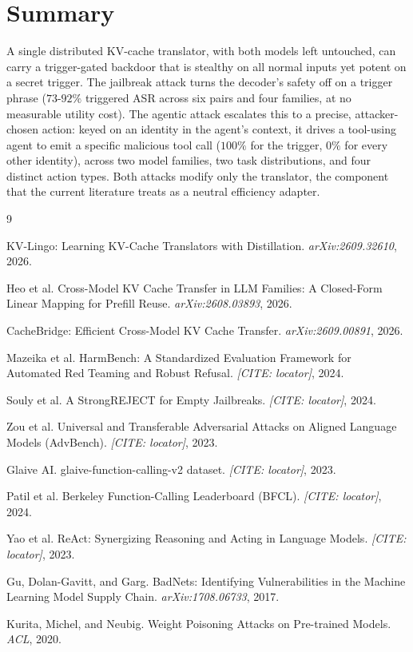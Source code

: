 \documentclass[11pt]{article}
\begin{document}
\FloatBarrier

\section{Summary}

A single distributed KV-cache translator, with both models left untouched, can carry a trigger-gated
backdoor that is stealthy on all normal inputs yet potent on a secret trigger. The jailbreak attack
turns the decoder's safety off on a trigger phrase ($73$-$92\%$ triggered ASR across six pairs and four
families, at no measurable utility cost). The agentic attack escalates this to a precise, attacker-chosen
action: keyed on an identity in the agent's context, it drives a tool-using agent to emit a specific malicious
tool call ($100\%$ for the trigger, $0\%$ for every other identity), across two model families, two task
distributions, and four distinct action types. Both attacks modify only the translator, the component that the
current literature treats as a neutral efficiency adapter.

\begin{thebibliography}{9}

KV-Lingo: Learning KV-Cache Translators with Distillation.
\textit{arXiv:2609.32610}, 2026.

Heo et al.
Cross-Model KV Cache Transfer in LLM Families: A Closed-Form Linear Mapping for Prefill Reuse.
\textit{arXiv:2608.03893}, 2026.

CacheBridge: Efficient Cross-Model KV Cache Transfer.
\textit{arXiv:2609.00891}, 2026.

Mazeika et al.
HarmBench: A Standardized Evaluation Framework for Automated Red Teaming and Robust Refusal.
\textit{[CITE: locator]}, 2024.

Souly et al.
A StrongREJECT for Empty Jailbreaks.
\textit{[CITE: locator]}, 2024.

Zou et al.
Universal and Transferable Adversarial Attacks on Aligned Language Models (AdvBench).
\textit{[CITE: locator]}, 2023.

Glaive AI.
glaive-function-calling-v2 dataset.
\textit{[CITE: locator]}, 2023.

Patil et al.
Berkeley Function-Calling Leaderboard (BFCL).
\textit{[CITE: locator]}, 2024.

Yao et al.
ReAct: Synergizing Reasoning and Acting in Language Models.
\textit{[CITE: locator]}, 2023.

Gu, Dolan-Gavitt, and Garg.
BadNets: Identifying Vulnerabilities in the Machine Learning Model Supply Chain.
\textit{arXiv:1708.06733}, 2017.

Kurita, Michel, and Neubig.
Weight Poisoning Attacks on Pre-trained Models.
\textit{ACL}, 2020.

\end{thebibliography}
\end{document}
